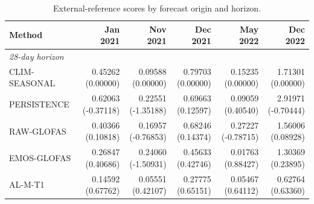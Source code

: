 \begin{table}[!htbp]
\centering
\begin{threeparttable}
\caption{External-reference scores by forecast origin and horizon.}
\label{tab:comment2_external_by_origin}
\fontsize{8.5}{10.5}\selectfont
\begin{tabular}{lrrrrr}
\hline
Method & Jan 2021 & Nov 2021 & Dec 2021 & May 2022 & Dec 2022 \\
\hline
\multicolumn{6}{l}{\textit{28-day horizon}} \\
CLIM-SEASONAL & \shortstack[r]{0.45262\\(0.00000)} & \shortstack[r]{0.09588\\(0.00000)} & \shortstack[r]{0.79703\\(0.00000)} & \shortstack[r]{0.15235\\(0.00000)} & \shortstack[r]{1.71301\\(0.00000)} \\
PERSISTENCE & \shortstack[r]{0.62063\\(-0.37118)} & \shortstack[r]{0.22551\\(-1.35188)} & \shortstack[r]{0.69663\\(0.12597)} & \shortstack[r]{0.09059\\(0.40540)} & \shortstack[r]{2.91971\\(-0.70444)} \\
RAW-GLOFAS & \shortstack[r]{0.40366\\(0.10818)} & \shortstack[r]{0.16957\\(-0.76853)} & \shortstack[r]{0.68246\\(0.14374)} & \shortstack[r]{0.27227\\(-0.78715)} & \shortstack[r]{1.56006\\(0.08928)} \\
EMOS-GLOFAS & \shortstack[r]{0.26847\\(0.40686)} & \shortstack[r]{0.24060\\(-1.50931)} & \shortstack[r]{0.45633\\(0.42746)} & \shortstack[r]{0.01763\\(0.88427)} & \shortstack[r]{1.30369\\(0.23895)} \\
AL-M-T1 & \shortstack[r]{0.14592\\(0.67762)} & \shortstack[r]{0.05551\\(0.42107)} & \shortstack[r]{0.27775\\(0.65151)} & \shortstack[r]{0.05467\\(0.64112)} & \shortstack[r]{0.62764\\(0.63360)} \\

\end{tabular}
\end{threeparttable}
\end{table}
